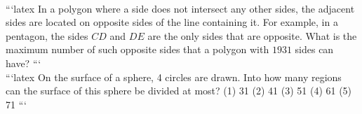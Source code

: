 \\
```latex
In a polygon where a side does not intersect any other sides, the adjacent sides are located on opposite sides of the line containing it. For example, in a pentagon, the sides $CD$ and $DE$ are the only sides that are opposite. What is the maximum number of such opposite sides that a polygon with $1931$ sides can have?
```
\\
```latex
On the surface of a sphere, 4 circles are drawn. Into how many regions can the surface of this sphere be divided at most? (1) 31 (2) 41 (3) 51 (4) 61 (5) 71
```
\\
